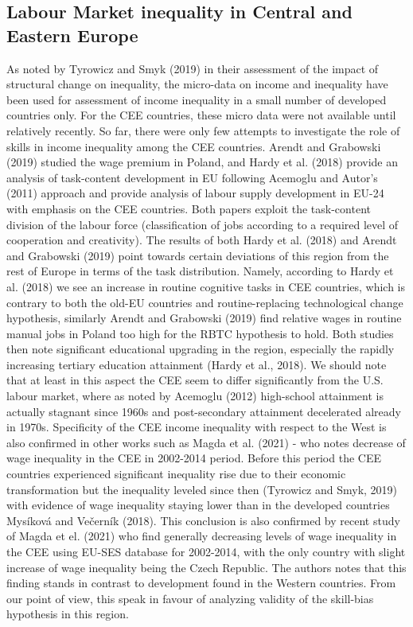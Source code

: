 \documentclass{article}
\begin{document}
\subsection{Labour Market inequality in Central and Eastern Europe}
As noted by Tyrowicz and Smyk (2019) in their assessment of the impact of structural change on inequality, the micro-data on income and inequality have been used for assessment of income inequality in a small number of developed countries only. For the CEE countries, these micro data were not available until relatively recently.
So far, there were only few attempts to investigate the role of skills in income inequality among the CEE countries. Arendt and Grabowski (2019) studied the wage premium in Poland, and Hardy et al. (2018) provide an analysis of task-content development in EU following Acemoglu and Autor's (2011) approach and provide analysis of labour supply development in EU-24 with emphasis on the CEE countries. Both papers exploit the task-content division of the labour force (classification of jobs according to a required level of cooperation and creativity).
The results of both Hardy et al. (2018) and Arendt and Grabowski (2019) point towards certain deviations of this region from the rest of Europe in terms of the task distribution. Namely, according to Hardy et al. (2018) we see an increase in routine cognitive tasks in CEE countries, which is contrary to both the old-EU countries and routine-replacing technological change hypothesis, similarly Arendt and Grabowski (2019) find relative wages in routine manual jobs in Poland too high for the RBTC hypothesis to hold. Both studies then note significant educational upgrading in the region, especially the rapidly increasing tertiary education attainment (Hardy et al., 2018). We should note that at least in this aspect the CEE seem to differ significantly from the U.S. labour market, where as noted by Acemoglu (2012) high-school attainment is actually stagnant since 1960s and post-secondary attainment decelerated already in 1970s. Specificity of the CEE income inequality with respect to the West is also confirmed in other works such as Magda et al. (2021) - who notes decrease of wage inequality in the CEE in 2002-2014 period. Before this period the CEE countries experienced significant inequality rise due to their economic transformation but the inequality leveled since then (Tyrowicz and Smyk, 2019) with evidence of wage inequality staying lower than in the developed countries Mysíková and Večerník (2018). This conclusion is also confirmed by recent study of Magda et el. (2021) who find generally decreasing levels of wage inequality in the CEE using EU-SES database for 2002-2014, with the only country with slight increase of wage inequality being the Czech Republic. The authors notes that this finding stands in contrast to development found in the Western countries. From our point of view, this speak in favour of analyzing validity of the skill-bias hypothesis in this region.
\end{document}

